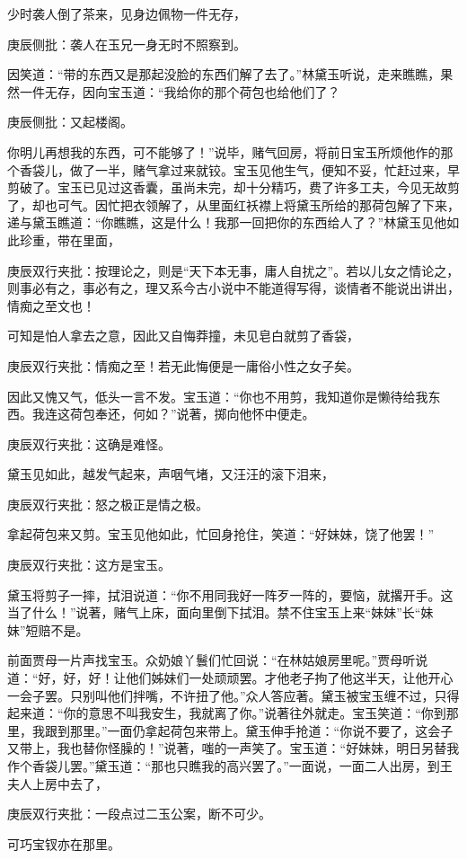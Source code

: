 \begin{parag}
    少时袭人倒了茶来，见身边佩物一件无存，\begin{note}庚辰侧批：袭人在玉兄一身无时不照察到。\end{note}因笑道：“带的东西又是那起没脸的东西们解了去了。”林黛玉听说，走来瞧瞧，果然一件无存，因向宝玉道：“我给你的那个荷包也给他们了？\begin{note}庚辰侧批：又起楼阁。\end{note}你明儿再想我的东西，可不能够了！”说毕，赌气回房，将前日宝玉所烦他作的那个香袋儿，做了一半，赌气拿过来就铰。宝玉见他生气，便知不妥，忙赶过来，早剪破了。宝玉已见过这香囊，虽尚未完，却十分精巧，费了许多工夫，今见无故剪了，却也可气。因忙把衣领解了，从里面红袄襟上将黛玉所给的那荷包解了下来，递与黛玉瞧道：“你瞧瞧，这是什么！我那一回把你的东西给人了？”林黛玉见他如此珍重，带在里面，\begin{note}庚辰双行夹批：按理论之，则是“天下本无事，庸人自扰之”。若以儿女之情论之，则事必有之，事必有之，理又系今古小说中不能道得写得，谈情者不能说出讲出，情痴之至文也！\end{note}可知是怕人拿去之意，因此又自悔莽撞，未见皂白就剪了香袋，\begin{note}庚辰双行夹批：情痴之至！若无此悔便是一庸俗小性之女子矣。\end{note}因此又愧又气，低头一言不发。宝玉道：“你也不用剪，我知道你是懒待给我东西。我连这荷包奉还，何如？”说著，掷向他怀中便走。\begin{note}庚辰双行夹批：这确是难怪。\end{note}黛玉见如此，越发气起来，声咽气堵，又汪汪的滚下泪来，\begin{note}庚辰双行夹批：怒之极正是情之极。\end{note}拿起荷包来又剪。宝玉见他如此，忙回身抢住，笑道：“好妹妹，饶了他罢！”\begin{note}庚辰双行夹批：这方是宝玉。\end{note}黛玉将剪子一摔，拭泪说道：“你不用同我好一阵歹一阵的，要恼，就撂开手。这当了什么！”说著，赌气上床，面向里倒下拭泪。禁不住宝玉上来“妹妹”长“妹妹”短赔不是。
\end{parag}


\begin{parag}
    前面贾母一片声找宝玉。众奶娘丫鬟们忙回说：“在林姑娘房里呢。”贾母听说道：“好，好，好！让他们姊妹们一处顽顽罢。才他老子拘了他这半天，让他开心一会子罢。只别叫他们拌嘴，不许扭了他。”众人答应著。黛玉被宝玉缠不过，只得起来道：“你的意思不叫我安生，我就离了你。”说著往外就走。宝玉笑道：“你到那里，我跟到那里。”一面仍拿起荷包来带上。黛玉伸手抢道：“你说不要了，这会子又带上，我也替你怪臊的！”说著，嗤的一声笑了。宝玉道：“好妹妹，明日另替我作个香袋儿罢。”黛玉道：“那也只瞧我的高兴罢了。”一面说，一面二人出房，到王夫人上房中去了，\begin{note}庚辰双行夹批：一段点过二玉公案，断不可少。\end{note}可巧宝钗亦在那里。
\end{parag}


